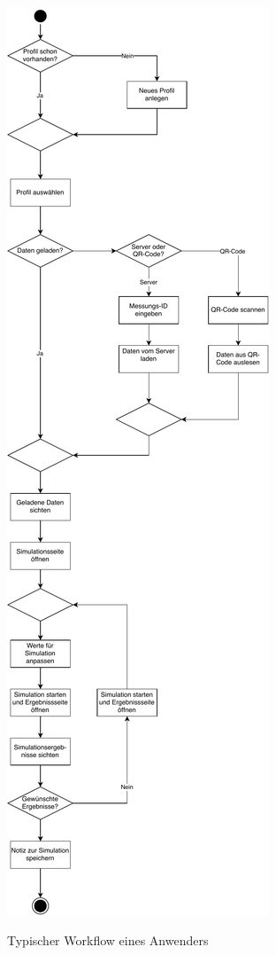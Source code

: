     \begin{figure}[H]
    	\centering
   		\includegraphics[width=\textwidth,height=\textheight,keepaspectratio]{../include/images/workflow/workflow}
    	\label{img:workflow}
    	\caption{Typischer Workflow eines Anwenders}
    \end{figure}